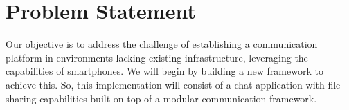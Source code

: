 \section{Problem Statement}

Our objective is to address the challenge of establishing a communication
platform in environments lacking existing infrastructure, leveraging the
capabilities of smartphones. We will begin by building a new framework to
achieve this. So, this implementation will consist of a chat application with
file-sharing capabilities built on top of a modular communication framework.